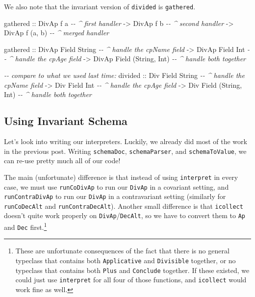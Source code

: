 \documentclass[]{article}
\newenvironment{Shaded}{}{}
\newcommand{\CommentTok}[1]{\textcolor[rgb]{0.38,0.63,0.69}{\textit{#1}}}
\newcommand{\DataTypeTok}[1]{\textcolor[rgb]{0.56,0.13,0.00}{#1}}
\newcommand{\NormalTok}[1]{#1}
\newcommand{\OtherTok}[1]{\textcolor[rgb]{0.00,0.44,0.13}{#1}}
\begin{document}
We also note that the invariant version of \texttt{divided} is
\texttt{gathered}.

\begin{Shaded}
\begin{Highlighting}[]
\NormalTok{gathered}
\OtherTok{    ::} \DataTypeTok{DivAp}\NormalTok{ f a          }\CommentTok{{-}{-} \^{} first handler}
    \OtherTok{{-}>} \DataTypeTok{DivAp}\NormalTok{ f b          }\CommentTok{{-}{-} \^{} second handler}
    \OtherTok{{-}>} \DataTypeTok{DivAp}\NormalTok{ f (a, b)     }\CommentTok{{-}{-} \^{} merged handler}

\NormalTok{gathered}
\OtherTok{    ::} \DataTypeTok{DivAp} \DataTypeTok{Field} \DataTypeTok{String}          \CommentTok{{-}{-} \^{} handle the cpName field}
    \OtherTok{{-}>} \DataTypeTok{DivAp} \DataTypeTok{Field} \DataTypeTok{Int}             \CommentTok{{-}{-} \^{} handle the cpAge field}
    \OtherTok{{-}>} \DataTypeTok{DivAp} \DataTypeTok{Field}\NormalTok{ (}\DataTypeTok{String}\NormalTok{, }\DataTypeTok{Int}\NormalTok{)   }\CommentTok{{-}{-} \^{} handle both together}

\CommentTok{{-}{-} compare to what we used last time:}
\NormalTok{divided}
\OtherTok{    ::} \DataTypeTok{Div} \DataTypeTok{Field} \DataTypeTok{String}          \CommentTok{{-}{-} \^{} handle the cpName field}
    \OtherTok{{-}>} \DataTypeTok{Div} \DataTypeTok{Field} \DataTypeTok{Int}             \CommentTok{{-}{-} \^{} handle the cpAge field}
    \OtherTok{{-}>} \DataTypeTok{Div} \DataTypeTok{Field}\NormalTok{ (}\DataTypeTok{String}\NormalTok{, }\DataTypeTok{Int}\NormalTok{)   }\CommentTok{{-}{-} \^{} handle both together}
\end{Highlighting}
\end{Shaded}

\hypertarget{using-invariant-schema}{%
\subsection{Using Invariant Schema}\label{using-invariant-schema}}

Let's look into writing our interpreters. Luckily, we already did most of the
work in the previous post. Writing \texttt{schemaDoc}, \texttt{schemaParser},
and \texttt{schemaToValue}, we can re-use pretty much all of our code!

The main (unfortunate) difference is that instead of using \texttt{interpret} in
every case, we must use \texttt{runCoDivAp} to run our \texttt{DivAp} in a
covariant setting, and \texttt{runContraDivAp} to run our \texttt{DivAp} in a
contravariant setting (similarly for \texttt{runCoDecAlt} and
\texttt{runContraDecAlt}). Another small difference is that \texttt{icollect}
doesn't quite work properly on \texttt{DivAp}/\texttt{DecAlt}, so we have to
convert them to \texttt{Ap} and \texttt{Dec} first.\footnote{These are
  unfortunate consequences of the fact that there is no general typeclass that
  contains both \texttt{Applicative} and \texttt{Divisible} together, or no
  typeclass that contains both \texttt{Plus} and \texttt{Conclude} together. If
  these existed, we could just use \texttt{interpret} for all four of those
  functions, and \texttt{icollect} would work fine as well.}
\end{document}

